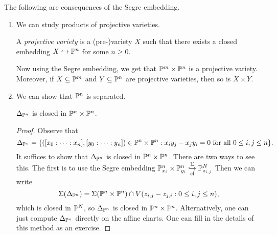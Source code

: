 \begin{remark}
  The following are consequences of the
  Segre embedding.
  \begin{enumerate}
    \item We can study products of
      projective varieties.

      \begin{definition}
        A \emph{projective variety}
        is a (pre-)variety $X$ such that
        there exists a closed embedding
        $X \hookrightarrow \mathbb{P}^n$ for some $n \ge 0$.
      \end{definition}

      Now using the Segre embedding,
      we get that
      $\mathbb{P}^m \times \mathbb{P}^n$ is a projective
      variety. Moreover, if
      $X \subseteq \mathbb{P}^m$ and $Y \subseteq \mathbb{P}^n$
      are projective varieties, then
      so is $X \times Y$.
    \item We can show that $\mathbb{P}^n$ is
      separated.

      \begin{lemma}\label{lem:pn-separated}
        $\Delta_{\mathbb{P}^n}$ is closed in
        $\mathbb{P}^n \times \mathbb{P}^n$.
      \end{lemma}

      \begin{proof}
        Observe that
        \[
          \Delta_{\mathbb{P}^n}
          = \{([x_0 : \cdots : x_n], [y_0 : \cdots : y_n]) \in \mathbb{P}^n \times \mathbb{P}^n :
            x_i y_j - x_j y_i
            = 0 \text{ for all }
            0 \le i, j \le n
          \}.
        \]
        It suffices to show that
        $\Delta_{\mathbb{P}^n}$ is closed in
        $\mathbb{P}^n \times \mathbb{P}^n$.
        There are two ways to see this.
        The first is to use the Segre
        embedding $\mathbb{P}^n_{x_i} \times \mathbb{P}^n_{y_i} \underset{\text{cl}}{\overset{\Sigma}{\hookrightarrow}} \mathbb{P}^{N}_{z_{i, j}}$
        Then we can write
        \[
          \Sigma(\Delta_{\mathbb{P}^n})
          = \Sigma(\mathbb{P}^n \times \mathbb{P}^n)
          \cap V(z_{i, j} - z_{j, i} : 0 \le i, j \le n),
        \]
        which is closed in $\mathbb{P}^N$, so
        $\Delta_{\mathbb{P}^n}$ is closed in
        $\mathbb{P}^n \times \mathbb{P}^n$.
        Alternatively, one can just compute
        $\Delta_{\mathbb{P}^n}$ directly on the
        affine charts. One can fill in the
        details of this method as an
        exercise.
      \end{proof}
  \end{enumerate}
\end{remark}

